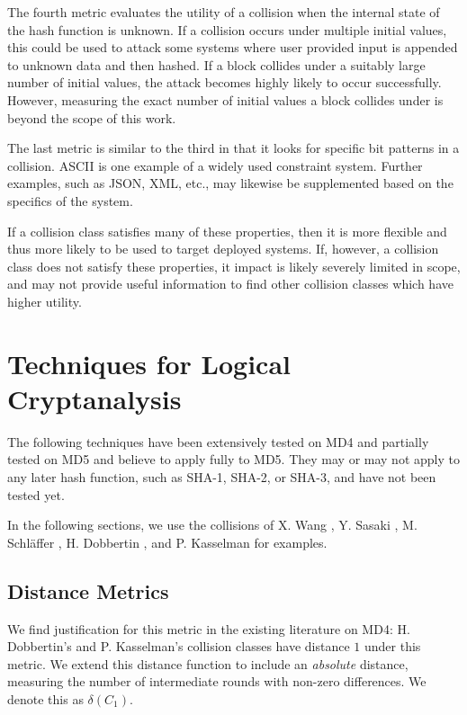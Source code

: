 \documentclass[conference]{IEEEtran}
\begin{document}
The fourth metric evaluates the utility of a collision when the internal state
of the hash function is unknown. If a collision occurs under multiple initial
values, this could be used to attack some systems where user provided input is
appended to unknown data and then hashed. If a block collides under a suitably
large number of initial values, the attack becomes highly likely to occur
successfully. However, measuring the exact number of initial values a block
collides under is beyond the scope of this work.

The last metric is similar to the third in that it looks for specific bit
patterns in a collision. ASCII is one example of a widely used constraint
system. Further examples, such as JSON, XML, etc., may likewise be
supplemented based on the specifics of the system.

If a collision class satisfies many of these properties, then it is more
flexible and thus more likely to be used to target deployed systems. If,
however, a collision class does not satisfy these properties, it impact is
likely severely limited in scope, and may not provide useful information to
find other collision classes which have higher utility.








\section{Techniques for Logical Cryptanalysis} \label{Sec:Logical}

The following techniques have been extensively tested on MD4 and partially
tested on MD5 and believe to apply fully to MD5. They may or may not apply
to any later hash function, such as SHA-1, SHA-2, or SHA-3, and have not been
tested yet.

In the following sections, we use the collisions of X. Wang \cite{Wang2005},
Y. Sasaki \cite{Sasaki2007}, M. Schl{\"a}ffer \cite{Schlaffer2006}, H. Dobbertin
\cite{Dobbertin1998}, and P. Kasselman \cite{KasselmanMD4} for examples.


\subsection{Distance Metrics}

We find justification for this metric in the existing literature on MD4:
H. Dobbertin's \cite{Dobbertin1998} and P. Kasselman's \cite{KasselmanMD4}
collision classes have distance $1$ under this metric. We extend this distance
function to include an \textit{absolute} distance, measuring the number of
intermediate rounds with non-zero differences. We denote this as $\delta(C_1)$.
\end{document}
